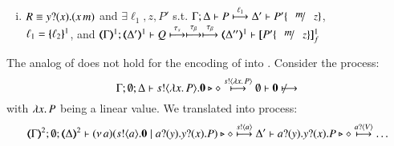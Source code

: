 \begin{proposition}
\begin{enumerate}[1.]
\begin{enumerate}[a)]
\begin{enumerate}[(i)]
						\item	$R \equiv y ? (x) . (x\, {m})$ and 
							$\exists \ell_1, z, P'$ s.t. 
							$\horel{\Gamma}{\Delta}{P}{\hby{\ell_1}}{\Delta'}{P' \subst{m}{z}}$, \\
							$\ell_1 = \{\!\!\{\ell_2\}\!\!\}^{1}$,
							and 
							$\horel{\tmap{\Gamma}{1}}{\tmap{\Delta'}{1}}{Q}{\hby{\stau} \hby{\btau} \hby{\btau}}{\tmap{\Delta''}{1}}{\pmapp{P'\subst{m}{z}}{1}{f}}$
					\end{enumerate}
			
%
%
		    \end{enumerate}
		    
	\end{enumerate}
\end{proposition}

The analog of  does not hold for the encoding of \HOp into \sessp.
Consider the \HOp process:
\[
	\Gamma; \es; \Delta \proves \bout{s}{\abs{x}{P}} \inact \hastype \Proc \hby{\bactout{s}{\abs{x} P}} \es \proves \inact \not \hby{}
\]
with $\lambda x.\,P$ being a linear value.
We translated into \sessp process:
\[\tmap{\Gamma}{2}; \es; \tmap{\Delta}{2} \proves \newsp{a}{\bout{s}{a} \inact \Par \binp{a}{y} \binp{y}{x} P} \hastype \Proc
	 \hby{\bactout{s}{a}} \Delta' \proves \binp{a}{y} \binp{y}{x} P \hastype \Proc
\hby{\bactinp{a}{V}} \dots
\]

